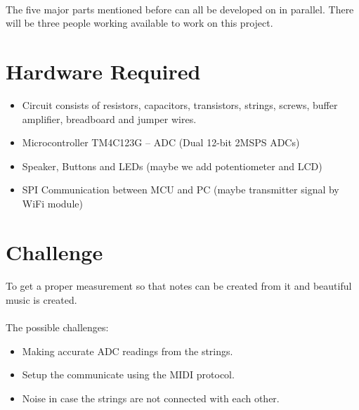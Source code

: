 \documentclass{article}
\begin{document}
\paragraph{}The five major parts mentioned before can all be developed on in parallel. There will be three people working available to work on this project.

\section{Hardware Required}
\begin{itemize}
    \item Circuit consists of resistors, capacitors, transistors, strings, screws, buffer amplifier, breadboard and jumper wires.  
    \item Microcontroller TM4C123G – ADC (Dual 12-bit 2MSPS ADCs)
    \item Speaker, Buttons and LEDs (maybe we add potentiometer and LCD)
    \item SPI Communication between MCU and PC (maybe transmitter signal by WiFi module)
\end{itemize}


\section{Challenge}
\paragraph{}To get a proper measurement so that notes can be created from it and beautiful music is created.
\paragraph{}The possible challenges:
\begin{itemize}
    \item Making accurate ADC readings from the strings.
    \item Setup the communicate using the MIDI protocol.
    \item Noise in case the strings are not connected with each other.
\end{itemize}
\end{document}
